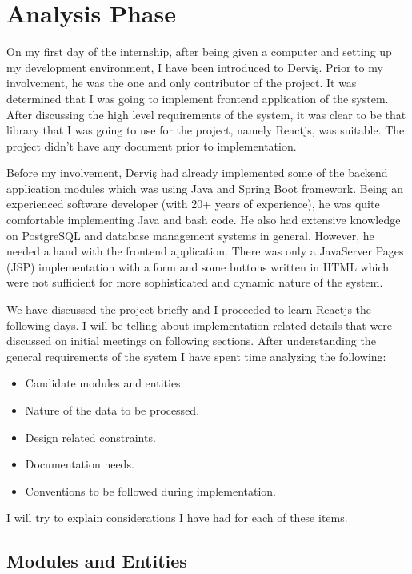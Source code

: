 \section{Analysis Phase}
On my first day of the internship, after being given a computer and setting up 
my development environment, I have been introduced to Derviş. Prior to my 
involvement, he was the one and only contributor of the project. It was 
determined that I was going to implement frontend application of the system. 
After discussing the high level requirements of the system, it was clear to be 
that library that I was going to use for the project, namely Reactjs, was 
suitable. The project didn't have any document prior to implementation.
\par
Before my involvement, Derviş had already implemented some of the backend 
application modules which was using Java and Spring Boot framework. Being an 
experienced software developer (with 20+ years of experience), he was quite 
comfortable implementing Java and bash code. He also had extensive knowledge 
on PostgreSQL and database management systems in general. However, he needed 
a hand with the frontend application. There was only a JavaServer Pages (JSP) 
implementation with a form and some buttons written in HTML which were not 
sufficient for more sophisticated and dynamic nature of the system.
\par
We have discussed the project briefly and I proceeded to learn Reactjs the 
following days. I will be telling about implementation related details that 
were discussed on initial meetings on following sections. After understanding 
the general requirements of the system I have spent time analyzing the 
following:
\begin{itemize}
    \item Candidate modules and entities.
    \item Nature of the data to be processed.
    \item Design related constraints.
    \item Documentation needs.
    \item Conventions to be followed during implementation.
\end{itemize}

I will try to explain considerations I have had for each of these items. 

\subsection{Modules and Entities}

